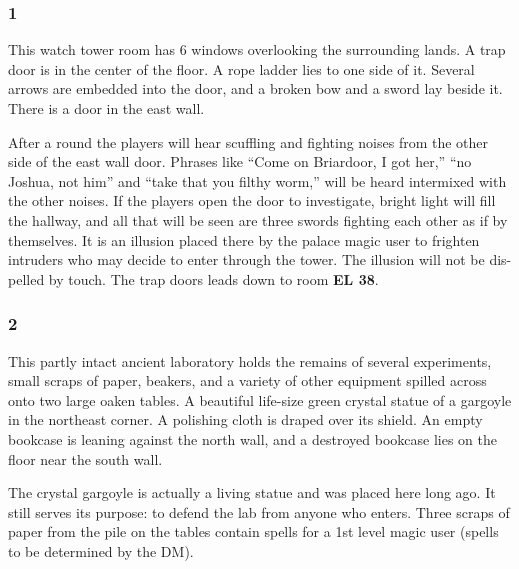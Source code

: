 \documentclass[palace_of_the_silver_princess]{subfiles}
\begin{document}
\selectfont
\clearpage


\subsubsection{1}
\begin{quotebox}
    This watch tower room has 6 windows overlooking the surrounding
    lands. A trap door is in the center of the floor. A rope ladder lies
    to one side of it. Several arrows are embedded into the door, and a
    broken bow and a sword lay beside it.  There is a door in the east
    wall.
\end{quotebox}

After a round the players will hear scuffling and fighting noises from
the other side of the east wall door. Phrases like “Come on Briardoor, I
got her,” “no Joshua, not him” and “take that you filthy worm,” will be
heard intermixed with the other noises. If the players open the door to
investigate, bright light will fill the hallway, and all that will be
seen are three swords fighting each other as if by themselves. It is an
illusion placed there by the palace magic user to frighten intruders who
may decide to enter through the tower. The illusion will not be dis-
pelled by touch. The trap doors leads down to room \textbf{EL 38}.

\subsubsection{2}
\begin{quotebox}
    This partly intact ancient laboratory holds the remains of several
    experiments, small scraps of paper, beakers, and a variety of other
    equipment spilled across onto two large oaken tables. A beautiful
    life-size green crystal statue of a gargoyle in the northeast
    corner. A polishing cloth is draped over its shield. An empty
    bookcase is leaning against the north wall, and a destroyed bookcase
    lies on the floor near the south wall.
\end{quotebox}

The crystal gargoyle is actually a living statue and was placed here long
ago. It still serves its purpose: to defend the lab from anyone who
enters. Three scraps of paper from the pile on the tables contain spells
for a 1st level magic user (spells to be determined by the DM).
\end{document}
